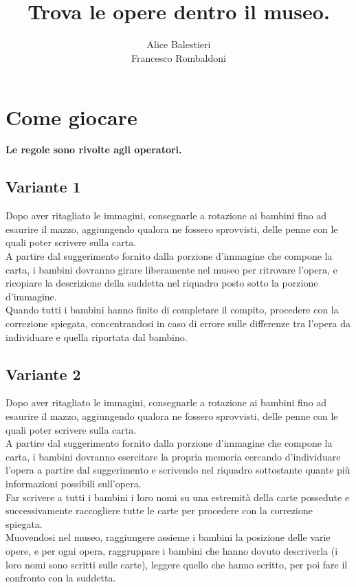\documentclass[hidelinks,12pt,a4paper]{article}
\begin{document}
	
	\title{\textbf{\\Trova le opere dentro il museo.}}
	\author{Alice Balestieri\\Francesco Rombaldoni}
	\date{}
	
	\maketitle
	\newpage
	
	\tableofcontents
	\newpage
	
	\section{Come giocare}
	\begin{center}
		\textbf{Le regole sono rivolte agli operatori.}
	\end{center}
	
	\subsection{Variante 1}
	Dopo aver ritagliato le immagini, consegnarle a rotazione ai bambini fino ad esaurire il mazzo, aggiungendo qualora ne fossero sprovvisti, delle penne con le quali poter scrivere sulla carta.\\
	A partire dal suggerimento fornito dalla porzione d'immagine che compone la carta, i bambini dovranno girare liberamente nel museo per ritrovare l'opera, e ricopiare la descrizione della suddetta nel riquadro posto sotto la porzione d'immagine.\\
	Quando tutti i bambini hanno finito di completare il compito, procedere con la correzione spiegata, concentrandosi in caso di errore sulle differenze tra l'opera da individuare e quella riportata dal bambino.
	
	\subsection{Variante 2}
	Dopo aver ritagliato le immagini, consegnarle a rotazione ai bambini fino ad esaurire il mazzo, aggiungendo qualora ne fossero sprovvisti, delle penne con le quali poter scrivere sulla carta.\\
	A partire dal suggerimento fornito dalla porzione d'immagine che compone la carta, i bambini dovranno esercitare la propria memoria cercando d'individuare l'opera a partire dal suggerimento e scrivendo nel riquadro sottostante quante più informazioni possibili sull'opera.\\
	Far scrivere a tutti i bambini i loro nomi su una estremità della carte possedute e successivamente raccogliere tutte le carte per procedere con la correzione spiegata.\\
	 Muovendosi nel museo, raggiungere assieme i bambini la posizione delle varie opere, e per ogni opera, raggruppare i bambini che hanno dovuto descriverla (i loro nomi sono scritti sulle carte), leggere quello che hanno scritto, per poi fare il confronto con la suddetta.
	
\end{document}
